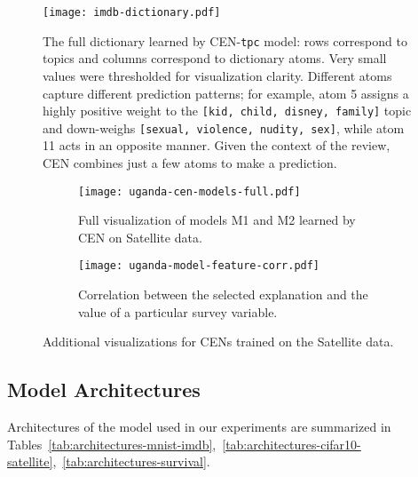 \documentclass[twoside,11pt]{article}
\begin{document}
\begin{figure}[t!]
\centering
\texttt{[image: imdb-dictionary.pdf]}\caption{The full dictionary learned by CEN-\texttt{tpc} model: rows correspond to topics and columns correspond to dictionary atoms.
Very small values were thresholded for visualization clarity.
Different atoms capture different prediction patterns;
for example, atom 5 assigns a highly positive weight to the \texttt{[kid, child, disney, family]} topic and down-weighs \texttt{[sexual, violence, nudity, sex]}, while atom 11 acts in an opposite manner.
Given the context of the review, CEN combines just a few atoms to make a prediction.}
\label{fig:imdb-dict-tpc}
\end{figure}
 

\begin{figure}[th!]
\begin{subfigure}[b]{\textwidth}
    \centering
    \texttt{[image: uganda-cen-models-full.pdf]}
    \vspace{-4ex}\caption{Full visualization of models M1 and M2 learned by CEN on Satellite data.
    }\label{fig:satellite-models-full}
\end{subfigure}
\begin{subfigure}[b]{\textwidth}
    \centering
    \texttt{[image: uganda-model-feature-corr.pdf]}
    \vspace{-4ex}\caption{Correlation between the selected explanation and the value of a particular survey variable.
    }\label{fig:satellite-models-feature-corr}
\end{subfigure}
\caption{Additional visualizations for CENs trained on the Satellite data.}
\label{fig:satellite-appendix}
\end{figure}
 

\subsection{Model Architectures}
\label{app:architectures}

Architectures of the model used in our experiments are summarized in Tables~\ref{tab:architectures-mnist-imdb},~\ref{tab:architectures-cifar10-satellite},~\ref{tab:architectures-survival}.

\clearpage
\end{document}
